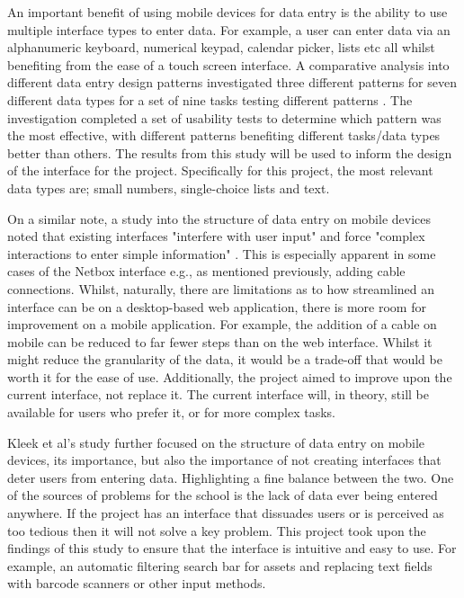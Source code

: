\documentclass [11pt,a4paper]{article}
\begin{document}
An important benefit of using mobile devices for data entry is the ability to use multiple interface types to enter data. For example, a user can enter data via an alphanumeric keyboard, numerical keypad, calendar picker, lists etc all whilst benefiting from the ease of a touch screen interface. A comparative analysis into different data entry design patterns investigated three different patterns for seven different data types for a set of nine tasks testing different patterns \cite{myka2019comparative}. The investigation completed a set of usability tests to determine which pattern was the most effective, with different patterns benefiting different tasks/data types better than others. The results from this study will be used to inform the design of the interface for the project. Specifically for this project, the most relevant data types are; small numbers, single-choice lists and text.

On a similar note, a study into the structure of data entry on mobile devices noted that existing interfaces "interfere with user input" and force "complex interactions to enter simple information" \cite{van2007gui}. This is especially apparent in some cases of the Netbox interface e.g., as mentioned previously, adding cable connections. Whilst, naturally, there are limitations as to how streamlined an interface can be on a desktop-based web application, there is more room for improvement on a mobile application. For example, the addition of a cable on mobile can be reduced to far fewer steps than on the web interface. Whilst it might reduce the granularity of the data, it would be a trade-off that would be worth it for the ease of use. Additionally, the project aimed to improve upon the current interface, not replace it. The current interface will, in theory, still be available for users who prefer it, or for more complex tasks.

Kleek et al's \cite{van2007gui} study further focused on the structure of data entry on mobile devices, its importance, but also the importance of not creating interfaces that deter users from entering data. Highlighting a fine balance between the two. One of the sources of problems for the school is the lack of data ever being entered anywhere. If the project has an interface that dissuades users or is perceived as too tedious then it will not solve a key problem. This project took upon the findings of this study to ensure that the interface is intuitive and easy to use. For example, an automatic filtering search bar for assets and replacing text fields with barcode scanners or other input methods.
\end{document}

